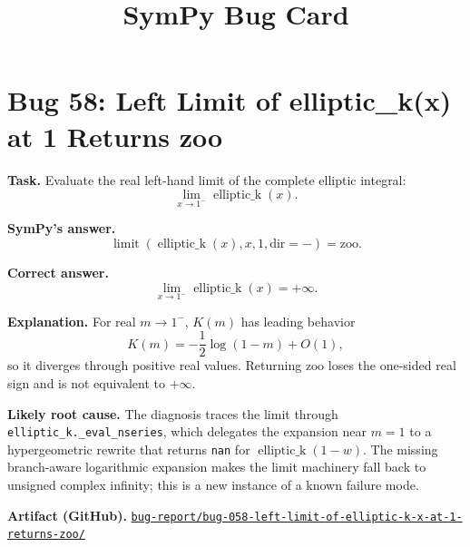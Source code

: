 \documentclass[11pt]{article}
\title{SymPy Bug Card}
\author{}
\date{}
\newcommand{\artifactrepo}{https://github.com/TODO-org/TODO-repo}
\newcommand{\bugbundle}[1]{\href{\artifactrepo/tree/main/bug-report/#1}{\nolinkurl{bug-report/#1/}}}
\begin{document}
\maketitle

\section*{Bug 58: Left Limit of elliptic\_k(x) at 1 Returns zoo}

\begin{counterexamplebox}
\textbf{Task.} Evaluate the real left-hand limit of the complete elliptic integral:
\[
\lim_{x\to1^-}\operatorname{elliptic\_k}(x).
\]

\medskip
\textbf{SymPy's answer.}
\[
\operatorname{limit}(\operatorname{elliptic\_k}(x),x,1,\mathrm{dir}=-)=\mathrm{zoo}.
\]

\medskip
\textbf{Correct answer.}
\[
\lim_{x\to1^-}\operatorname{elliptic\_k}(x)=+\infty.
\]

\medskip
\textbf{Explanation.} For real \(m\to1^-\), \(K(m)\) has leading behavior
\[
K(m)=-\frac12\log(1-m)+O(1),
\]
so it diverges through positive real values. Returning \(\mathrm{zoo}\) loses the one-sided real sign and is not equivalent to \(+\infty\).

\medskip
\textbf{Likely root cause.} The diagnosis traces the limit through \texttt{elliptic\_k.\_eval\_nseries}, which delegates the expansion near \(m=1\) to a hypergeometric rewrite that returns \texttt{nan} for \(\operatorname{elliptic\_k}(1-w)\). The missing branch-aware logarithmic expansion makes the limit machinery fall back to unsigned complex infinity; this is a new instance of a known failure mode.

\medskip
\textbf{Artifact (GitHub).} \bugbundle{bug-058-left-limit-of-elliptic-k-x-at-1-returns-zoo}
\end{counterexamplebox}
\end{document}
